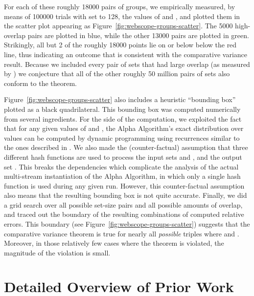 \documentclass{article}
\begin{document}
For each of these roughly 18000 pairs of groups, we empirically
measured, by means of 100000 trials with  set to 128,
the values of  and
, and plotted them in the scatter plot
appearing as Figure~\ref{fig:webscope-groups-scatter}.
The 5000 high-overlap pairs are plotted in blue, while the other 13000
pairs are plotted in green.  Strikingly, all but 2 of the roughly
18000 points lie on or below below the red line, thus indicating an
outcome that is consistent with the comparative variance result.
Because we included every pair of sets that had large overlap
(as measured by ) we conjecture that all of the
other roughly 50 million pairs of sets also conform to the theorem.





Figure~\ref{fig:webscope-groups-scatter} also includes a heuristic
``bounding box'' plotted as a black quadrilateral.
This bounding box was computed numerically from
several ingredients.  For the  side of the
computation, we exploited the fact that for any given values of 
and , the Alpha Algorithm's exact distribution over  values
can be computed by dynamic programming using recurrences similar to
the ones described in \cite{flajolet1985approximate}.  
We also made
the (counter-factual) assumption that three different hash functions are
used to process the input sets  and , and the output set
. This breaks the dependencies which complicate the analysis of the actual
multi-stream instantiation of the Alpha Algorithm, in which only a single hash
function is used during any given run. However, this counter-factual
assumption also means that the resulting bounding
box is not quite accurate. Finally, we did a grid search over
all possible set-size pairs
 and all
possible amounts of overlap, and traced out the boundary of the
resulting combinations of computed relative errors.
This boundary (see Figure~\ref{fig:webscope-groups-scatter}) suggests
that the comparative variance theorem is true for nearly all {\em possible} triples
 where  and
. Moreover, in those relatively few
cases where the theorem is violated, the magnitude of the
violation is small.



\section{Detailed Overview of Prior Work}
\label{app:priorwork}
\end{document}
